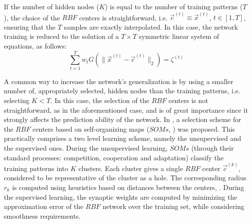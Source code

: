 If the number of hidden nodes ($K$) is equal to the number of training patterns ($T$), the choice of the $RBF$ centers is straightforward, i.e.
$\vec{c}^{(t)}\!\equiv\!\vec{x}^{(t)}$, $t\!\in\![1,T]$, ensuring
that the $T$ samples are exactly interpolated. 
In this case, the network training is reduced to the solution of a $T\!\times\!T$ symmetric linear system of equations, as follows:
%
\begin{equation}
    \sum_{t=1}^{T} w_t G(\|\vec{x}^{(t)}-\vec{c}^{(t)}\|_2)=
    \zeta^{(t)}
    \nonumber
\end{equation}

A common way to increase the network's generalization \cite{Pog1990, Tik76, Tik95} is by using a smaller number of, appropriately selected, hidden nodes than the training patterns, i.e. selecting $K\!<\!T$. 
In this case, the selection of the $RBF$ centers is not straightforward, as in the aforementioned case, and is of great importance since 
it strongly affects the prediction ability of the network. 
In \cite{LTT_2_029}, a selection scheme for the $RBF$ centers based on 
self-organizing maps ($SOMs$, \cite{Fri94a, Hayk1999}) was proposed. 
This practically comprises a two level learning scheme, namely the unsupervised and the supervised ones.
During the unsupervised learning, $SOMs$ (through their standard processes: 
competition, cooperation and adaptation) classify the training 
patterns into $K$ clusters.  
Each cluster gives a single $RBF$ center $\vec{c}^{(k)}$, considered to be representative of the cluster as a hole. The corresponding radius $r_k$ is computed using heuristics based on distances between the centers, \cite{Karay1997, LTT_2_029, Hayk1999, BenArc02}.
During the supervised learning, the synaptic weights are computed by minimizing the approximation error of the $RBF$ network over the training set, while considering smoothness requirements.
%


